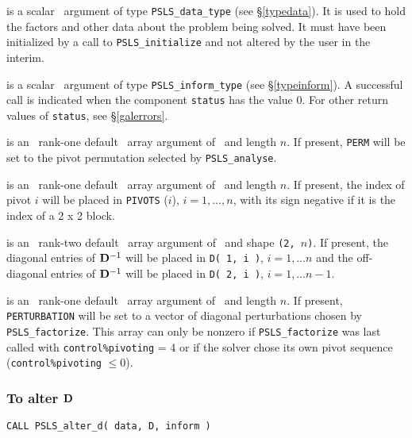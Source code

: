 \documentclass{galahad}
\newcommand{\packagename}{PSLS}
\begin{document}
\begin{description}

 is a scalar \intentinout\ argument of type
{\tt \packagename\_data\_type}
(see \S\ref{typedata}). It is used to hold the factors and other
data about the problem being solved.
It must have been initialized by a call to
{\tt \packagename\_ini\-tialize} and not altered by the user in the interim.

 is a scalar \intentinout\ argument of type
{\tt \packagename\_inform\_type}
(see \S\ref{typeinform}).
A successful call is indicated when the  component {\tt status} has the value 0.
For other return values of {\tt status}, see \S\ref{galerrors}.

 is an \optional\ rank-one default \integer\ array argument
of \intentout\ and length $n$.
If present, {\tt PERM} will be set to the pivot permutation
selected by {\tt \packagename\_analyse}.

 is an \optional\ rank-one default \integer\ array argument
of \intentout\  and length $n$.
If present, the index of pivot $i$ will be placed in
{\tt PIVOTS} ($i$), $i = 1, \ldots, n$, with its sign negative if it is
the index of a 2 x 2 block.

 is an \optional\ rank-two default \realdp\ array argument
of \intentout\, and shape {\tt (2, $n$)}.
If present, the diagonal entries of ${\mathbf{D}}^{-1} $ will
be placed in {\tt D( 1, i )}, $i = 1, \ldots n$ and the off-diagonal
entries of ${\mathbf{D}}^{-1} $ will be placed in {\tt D( 2, i )},
$i = 1, \ldots n-1$.

 is an \optional\ rank-one default \realdp\ array argument
of \intentout\ and length $n$.
If present, {\tt PERTURBATION} will be set to a vector of diagonal perturbations
chosen by {\tt \packagename\_factorize}. This array can only be nonzero if
{\tt \packagename\_factorize} was last called with {\tt control\%pivoting} = 4
or if the solver chose its own pivot sequence ({\tt control\%pivoting} $\leq 0$).

\end{description}

\subsubsection{To alter ${\mathbf{D}}$}

\hskip0.5in
{\tt CALL \packagename\_alter\_d( data, D, inform )}
\end{document}

